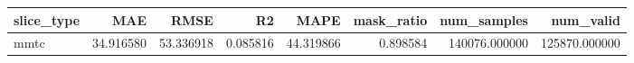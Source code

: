 \begin{tabular}{lrrrrrrr}
\toprule
slice_type & MAE & RMSE & R2 & MAPE & mask_ratio & num_samples & num_valid \\
\midrule
mmtc & 34.916580 & 53.336918 & 0.085816 & 44.319866 & 0.898584 & 140076.000000 & 125870.000000 \\
\bottomrule
\end{tabular}
